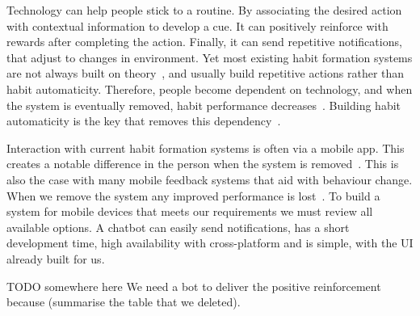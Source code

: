 \documentclass{scaffold/sigchi}
\begin{document}
Technology can help people stick to a routine. By associating the desired action with contextual information to develop a cue. It can positively reinforce with rewards after completing the action. Finally, it can send repetitive notifications, that adjust to changes in environment.
Yet most existing habit formation systems are not always built on theory~\cite{article_beyond_self_tracking_designing_apps}, and usually build repetitive actions rather than habit automaticity.
Therefore, people become dependent on technology, and when the system is eventually removed, habit performance decreases~\cite{article_dont_kick_habit}. Building habit automaticity is the key that removes this dependency~\cite{article_beyond_self_tracking_designing_apps}.

Interaction with current habit formation systems is often via a mobile app. This creates a notable difference in the person when the system is removed~\cite{article_my_phone_is_part_of_my_soul}.
This is also the case with many mobile feedback systems that aid with behaviour change.
When we remove the system any improved performance is lost~\cite{article_dont_kick_habit, article_realtime_feedback_improving_medication_taking}. To build a system for mobile devices that meets our requirements we must review all available options. A chatbot can easily send notifications, has a short development time, high availability with cross-platform and is simple, with the UI already built for us.

TODO somewhere here We need a bot to deliver the positive reinforcement because (summarise the table that we deleted).
\end{document}
